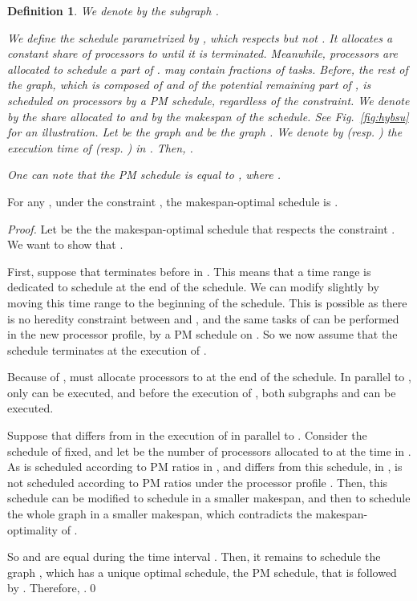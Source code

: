 \documentclass{llncs}
\newtheorem{defi}[theorem]{Definition}
\begin{document}
\begin{defi}
\label{def:su}
We denote by  the subgraph .

We define the schedule  parametrized by ,
which respects  but not . It allocates a constant share
 of processors to  until it is terminated. Meanwhile,
 processors are allocated to schedule a part  of . 
may contain fractions of tasks. Before, the rest of the graph, which
is composed of  and of the potential remaining part
 of , is scheduled on  processors by a PM schedule,
regardless of the  constraint. We denote by  the share
allocated to  and by  the makespan of the
schedule. See Fig.~\ref{fig:hybsu} for an illustration. 
Let  be the graph  and  be the graph .
We denote by   (resp. ) the execution time of  (resp. ) in . Then, .

One can note that the PM schedule  is equal to , where .



\end{defi}
 
 
 
\begin{lemma}
\label{lem:muopt}
For any , under the constraint , the makespan-optimal schedule is .
\end{lemma} 
 
\begin{proof}
Let  be the the makespan-optimal schedule that respects the constraint . We want to show that .

First, suppose that  terminates before  in . This means that a time range is dedicated to schedule  at the end of the schedule. We can modify slightly  by moving this time range to the beginning of the schedule. This is possible as there is no heredity constraint between  and , and the same tasks of  can be performed in the new processor profile, by a PM schedule on . So we now assume that the schedule terminates at the execution of .

Because of ,  must allocate  processors to  at the end of the schedule. In parallel to , only  can be executed, and before the execution of , both subgraphs  and  can be executed.

Suppose that  differs from  in the execution of  in parallel to . Consider the schedule of  fixed, and let  be the number of processors allocated to  at the time  in . As  is scheduled according to PM ratios in , and  differs from this schedule, in ,  is not scheduled according to PM ratios under the processor profile . Then, this schedule can be modified to schedule  in a smaller makespan, and then to schedule the whole graph  in a smaller makespan, which contradicts the makespan-optimality of .

So  and  are equal during the time interval . Then, it remains to schedule the graph , which has a unique optimal schedule, the PM schedule, that is followed by . Therefore, .\qed
\end{proof} 
 
\end{document}
